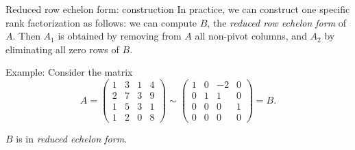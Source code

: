 \begin{mframe}{Reduced row echelon form: construction}
    In practice, we can construct one specific rank factorization as follows:
    we can compute $B$, the \textit{reduced row echelon form} of $A$. Then
    $A_1$ is obtained by removing from $A$ all non-pivot columns, and $A_2$ by
    eliminating all zero rows of $B$. \medskip

    Example: Consider the matrix 
    \begin{equation*}
        A = \begin{pmatrix}
            1 & 3 & 1 & 4 \\
            2 & 7 & 3 & 9 \\
            1 & 5 & 3 & 1 \\
            1 & 2 & 0 & 8
        \end{pmatrix}
        \sim
        \begin{pmatrix}
            1 & 0 & -2 & 0 \\
            0 & 1 & 1 & 0 \\
            0 & 0 & 0 & 1 \\
            0 & 0 & 0 & 0
        \end{pmatrix}
        = B.
    \end{equation*}
    
    $B$ is in \textit{reduced echelon form}.
\end{mframe}

